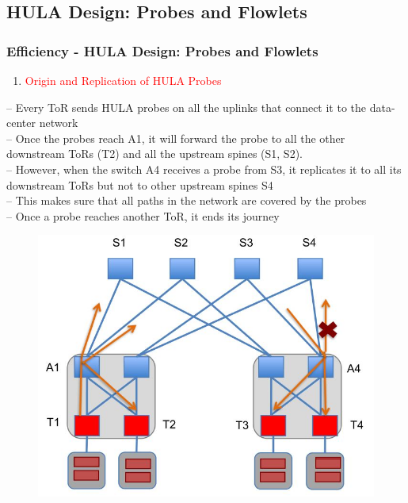 \documentclass{beamer}
\begin{document}

\subsection{HULA Design: Probes and Flowlets}
\begin{frame}
	\frametitle{Efficiency - HULA Design: Probes and Flowlets}
	\begin{enumerate}
	\item\textcolor{red}{Origin and Replication of HULA Probes}\\
	\end{enumerate}
	-- Every ToR sends HULA probes on all the uplinks that connect it to the data-center network\\
	-- Once the probes reach A1, it will forward the probe to all the other downstream ToRs (T2) and all the upstream spines (S1, S2).\\
	-- However, when the switch A4 receives a probe from S3, it replicates it to all its downstream ToRs but not to other upstream spines S4\\
	-- This makes sure that all paths in the network are covered by the probes\\
	-- Once a probe reaches another ToR, it ends its journey\\
	\begin{figure}
		\includegraphics[width=0.36\linewidth]{8}
	\end{figure}
\end{frame}

\end{document}

